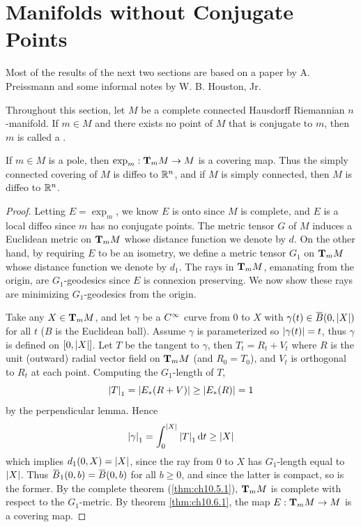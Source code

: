 \documentclass[../main]{subfiles}
\begin{document}
\section{Manifolds without Conjugate Points}\label{ch10:s7}

Most of the results of the next two sections are based on a paper by A. Preissmann and some informal notes by W. B. Houston, Jr.

Throughout this section, let $M$ be a complete connected Hausdorff Riemannian $n$-manifold. If $m\in M$ and there exists no point of $M$ that is conjugate to $m$, then $m$ is called a .



\begin{theorem} \label{thm:ch10.7.1}
If $m\in M$ is a pole, then $\exp_m:\ts Mm\functionMaps M$ is a covering map. Thus the simply connected covering of $M$ is diffeo to $\bR^n$, and if $M$ is simply connected, then $M$ is diffeo to $\bR^n$.
\end{theorem}

\begin{proof}
Letting $E=\exp_m$, we know $E$ is onto since $M$ is complete, and $E$ is a local diffeo since $m$ has no conjugate points. The metric tensor $G$ of $M$ induces a Euclidean metric on $\ts Mm$ whose distance function we denote by $d$. On the other hand, by requiring $E$ to be an isometry, we define a metric tensor $G_1$ on $\ts Mm$ whose distance function we denote by $d_1$. The rays in $\ts Mm$, emanating from the origin, are $G_1$-geodesics since $E$ is connexion preserving. We now show these rays are minimizing $G_1$-geodesics from the origin.

Take any $X\in\ts Mm$, and let $\gamma$ be a $\CInfty$ curve from 0 to $X$ with $\gamma(t)\in\xoverline B(0,\norm X)$ for all $t$ ($B$ is the Euclidean ball). Assume $\gamma$ is parameterized so $\norm{\gamma(t)}=t$, thus $\gamma$ is defined on $[0,\norm X]$. Let $T$ be the tangent to $\gamma$, then $T_t=R_t+V_t$ where $R$ is the unit (outward) radial vector field on $\ts Mm$ (and $R_0=T_0$), and $V_t$ is orthogonal to $R_t$ at each point. Computing the $G_1$-length of $T$,
\[\norm T_1 = \norm{E_*(R+V)} \ge \norm{E_*(R)} = 1\]
by the perpendicular lemma. Hence
\[\norm\gamma_1 = \int_0^{\norm X}\norm T_1\dd t \ge \norm X\]
which implies $d_1(0,X)=\norm X$, since the ray from 0 to $X$ has $G_1$-length equal to $\norm X$. Thus $\xoverline B_1(0,b)=\xoverline B(0,b)$ for all $b\ge0$, and since the latter is compact, so is the former. By the complete theorem (\ref{thm:ch10.5.1}), $\ts Mm$ is complete with respect to the $G_1$-metric. By theorem \ref{thm:ch10.6.1}, the map $E:\ts Mm\functionMaps M$ is a covering map.
\end{proof}
\end{document}
